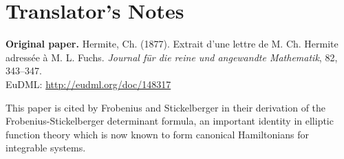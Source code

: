 \documentclass[12pt]{article}
\begin{document}
\newpage
\section*{Translator's Notes}

\vspace{1em}
\noindent\textbf{Original paper.} Hermite, Ch. (1877).
Extrait d'une lettre de M. Ch. Hermite adressée à M. L. Fuchs.
\textit{Journal für die reine und angewandte Mathematik}, 82, 343--347. \\[0.5em]
EuDML: \url{http://eudml.org/doc/148317}

\vspace{1em}

\noindent This paper is cited by Frobenius and Stickelberger in their derivation of the Frobenius-Stickelberger determinant formula, an important identity in elliptic function theory which is now known to form canonical Hamiltonians for integrable systems.

\vspace{1em}

\end{document}
